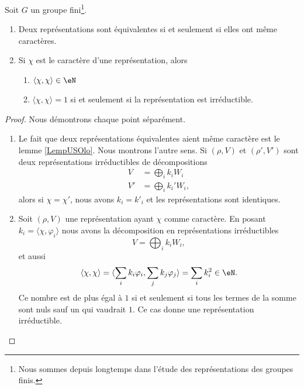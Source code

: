 \begin{theorem} \label{ThoWGkfADd}
    Soit \( G\) un groupe fini\footnote{Nous sommes depuis longtemps dans l'étude des représentations des groupes finis.}.
    \begin{enumerate}
        \item   \label{ItemZReOWoHi}
            Deux représentations sont équivalentes si et seulement si elles ont même caractères.
        \item   \label{ItemZReOWoHii}
            Si \( \chi\) est le caractère d'une représentation, alors 
            \begin{enumerate}
                \item
                    \( \langle \chi, \chi\rangle \in \eN\) 
                \item
                    \( \langle \chi, \chi\rangle =1\) si et seulement si la représentation est irréductible.
            \end{enumerate}
    \end{enumerate}
\end{theorem}

\begin{proof}
    Nous démontrons chaque point séparément.
    \begin{enumerate}
        \item
            
    Le fait que deux représentations équivalentes aient même caractère est le lemme \ref{LempUSOlo}. Nous montrons l'autre sens. Si \( (\rho,V)\) et \( (\rho',V')\) sont deux représentations irréductibles de décompositions
    \begin{subequations}
        \begin{align}
            V&=\bigoplus_ik_iW_i\\
            V'&=\bigoplus_ik_i'W_i,
        \end{align}
    \end{subequations}
    alors si \( \chi=\chi'\), nous avons \( k_i=k'_i\) et les représentations sont identiques.

\item

    Soit \( (\rho,V)\) une représentation ayant \( \chi\) comme caractère. En posant \( k_i=\langle \chi, \varphi_i\rangle \) nous avons la décomposition en représentations irréductibles
    \begin{equation}
        V=\bigoplus_ik_iW_i,
    \end{equation}
    et aussi
    \begin{equation}
        \langle \chi, \chi\rangle =\langle \sum_ik_i\varphi_i, \sum_jk_j\varphi_j\rangle =\sum_ik_i^2\in \eN.
    \end{equation}
    Ce nombre est de plus égal à \( 1\) si et seulement si tous les termes de la somme sont nuls sauf un qui vaudrait \( 1\). Ce cas donne une représentation irréductible.

    \end{enumerate}
    
\end{proof}

